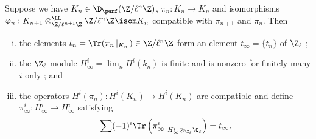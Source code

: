 \begin{lem} 
Suppose we have $K_n\in\D_{\perf}(\Z/\ell^n\Z)$, $\pi_n: K_n\to K_n$ and isomorphisms $\varphi_n: K_{n+1}\otimes^{\LL}_{\Z/\ell^{n+1}\Z}\Z/\ell^n\Z\isom K_n$ compatible with $\pi_{n+1}$ and $\pi_n$. Then
\begin{enumerate}[i.]
\item 
the elements $t_n=\Tr(\pi_n\left|_{K_n}\right.)\in \Z/\ell^n\Z$ form an element $t_\infty=\{t_n\}$ of $\Z_\ell$ ; 
\item 
the $\Z_\ell$-module $H_\infty^i=\lim_n H^i(k_n)$ is  finite and is nonzero for finitely many $i$ only ; and 
\item 
the operators $H^i(\pi_n): H^i(K_n)\to H^i(K_n)$ are compatible and define $\pi_\infty^i: H_\infty^i\to H_\infty^i$ satisfying
$$
\sum(-1)^i \Tr\left(\pi_\infty^i\big|_{H_\infty^i\otimes_{\Z_\ell}\Q_\ell}\right) = t_\infty.
$$
\end{enumerate}
\end{lem}

